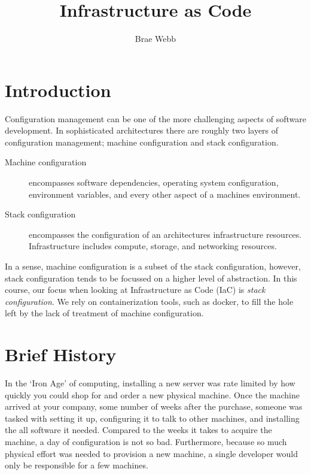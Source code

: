 \title{Infrastructure as Code}
\author{Brae Webb}
\date{}

\maketitle

\section{Introduction}
Configuration management can be one of the more challenging aspects of software development.
In sophisticated architectures there are roughly two layers of configuration management;
machine configuration and stack configuration.

\begin{description}
    \item[Machine configuration] encompasses software dependencies, operating system configuration, environment variables,
    and every other aspect of a machines environment.
    \item[Stack configuration] encompasses the configuration of an architectures infrastructure resources.
    Infrastructure includes compute, storage, and networking resources.
\end{description}

In a sense, machine configuration is a subset of the stack configuration, however,
stack configuration tends to be focussed on a higher level of abstraction.
In this course, our focus when looking at Infrastructure as Code (IaC) is \textsl{stack configuration}.
We rely on containerization tools, such as docker, to fill the hole left by the lack of treatment of machine configuration.

\section{Brief History}
In the `Iron Age' of computing, installing a new server was rate limited by how quickly you could shop for and order a new physical machine.
Once the machine arrived at your company,
some number of weeks after the purchase,
someone was tasked with setting it up,
configuring it to talk to other machines,
and installing the all software it needed.
Compared to the weeks it takes to acquire the machine,
a day of configuration is not so bad.
Furthermore, because so much physical effort was needed to provision a new machine,
a single developer would only be responsible for a few machines.

